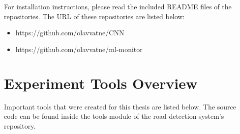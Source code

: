For installation instructions, please read the included README files of the repositories. The URL of these repositories are listed below:

\begin{itemize}
\item https://github.com/olavvatne/CNN
\item https://github.com/olavvatne/ml-monitor
\end{itemize} 

\section{Experiment Tools Overview}
\label{app:tools}
Important tools that were created for this thesis are listed below. The source code can be found inside the tools module of the road detection system's repository.

